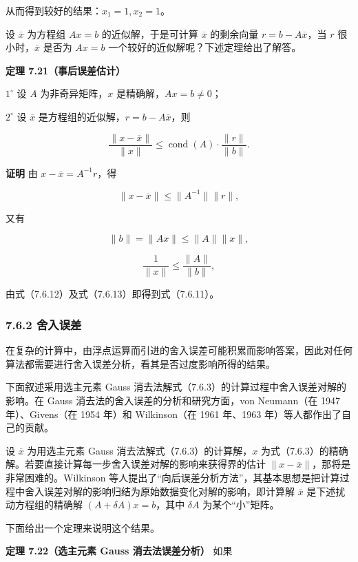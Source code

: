 \documentclass[
  10pt,
  fontset=fandol]{ctexart}
\begin{document}
从而得到较好的结果：\(x_1=1,x_2=1\)。

设 \(\overline x\) 为方程组 \(Ax=b\) 的近似解，于是可计算
\(\overline x\) 的剩余向量 \(r=b-A\overline x\)，当 \(r\)
很小时，\(\overline x\) 是否为 \(Ax=b\)
一个较好的近似解呢？下述定理给出了解答。

\textbf{定理 7.21（事后误差估计）}

\(1^\circ\) 设 \(A\) 为非奇异矩阵，\(x\) 是精确解，\(Ax=b\neq0\)；

\(2^\circ\) 设 \(\overline x\)
是方程组的近似解，\(r=b-A\overline x\)，则

\[
\frac{\|x-\overline x\|}{\|x\|}\leqslant\operatorname{cond}(A)\cdot\frac{\|r\|}{\|b\|}.
\tag{7.6.11}
\]

\textbf{证明} 由 \(x-\overline x=A^{-1}r\)，得

\[
\|x-\overline x\|\leqslant\|A^{-1}\|\|r\|,
\tag{7.6.12}
\]

又有

\[
\|b\|=\|Ax\|\leqslant\|A\|\|x\|,
\]

\[
\frac1{\|x\|}\leqslant\frac{\|A\|}{\|b\|},
\tag{7.6.13}
\]

由式（7.6.12）及式（7.6.13）即得到式（7.6.11）。

\subsubsection{7.6.2 舍入误差}\label{ux820dux5165ux8befux5dee}

在复杂的计算中，由浮点运算而引进的舍入误差可能积累而影响答案，因此对任何算法都需要进行舍入误差分析，看其是否过度影响所得的结果。

下面叙述采用选主元素 Gauss
消去法解式（7.6.3）的计算过程中舍入误差对解的影响。在 Gauss
消去法的舍入误差的分析和研究方面，von Neumann（在 1947 年）、Givens（在
1954 年）和 Wilkinson（在 1961 年、1963 年）等人都作出了自己的贡献。

设 \(\overline x\) 为用选主元素 Gauss 消去法解式（7.6.3）的计算解，\(x\)
为式（7.6.3）的精确解。若要直接计算每一步舍入误差对解的影响来获得界的估计
\(\|x-\overline x\|\)，那将是非常困难的。Wilkinson
等人提出了``向后误差分析方法''，其基本思想是把计算过程中舍入误差对解的影响归结为原始数据变化对解的影响，即计算解
\(\overline x\) 是下述扰动方程组的精确解 \((A+\delta A)x=b\)，其中
\(\delta A\) 为某个``小''矩阵。

下面给出一个定理来说明这个结果。

\textbf{定理 7.22（选主元素 Gauss 消去法误差分析）} 如果
\end{document}
